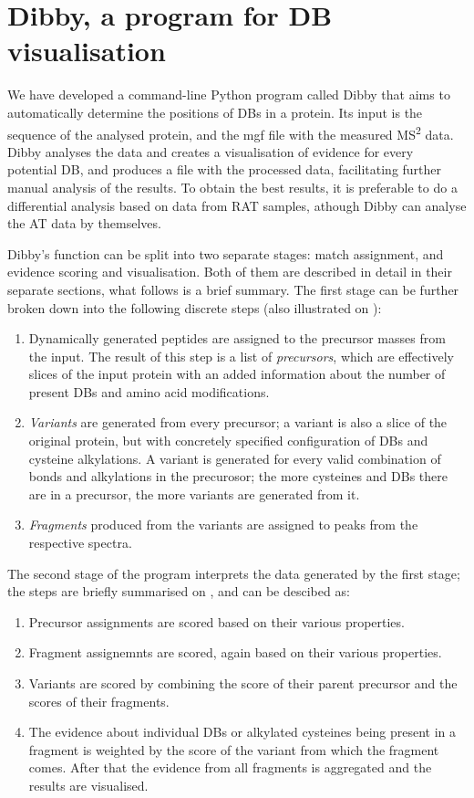 \section{Dibby, a program for DB visualisation}

We have developed a command-line Python program called Dibby that aims to automatically determine the positions of DBs in a protein. Its input is the sequence of the analysed protein, and the mgf file with the measured MS\textsuperscript{2} data. Dibby analyses the data and creates a visualisation of evidence for every potential DB, and produces a file with the processed data, facilitating further manual analysis of the results. To obtain the best results, it is preferable to do a differential analysis based on data from RAT samples, athough Dibby can analyse the AT data by themselves.

Dibby's function can be split into two separate stages: match assignment, and evidence scoring and visualisation. Both of them are described in detail in their separate sections, what follows is a brief summary. The first stage can be further broken down into the following discrete steps (also illustrated on ):

\begin{enumerate}
  \item Dynamically generated peptides are assigned to the precursor masses from the input. The result of this step is a list of \emph{precursors}, which are effectively slices of the input protein with an added information about the number of present DBs and amino acid modifications.
  \item \emph{Variants} are generated from every precursor; a variant is also a slice of the original protein, but with concretely specified configuration of DBs and cysteine alkylations. A variant is generated for every valid combination of bonds and alkylations in the precurosor; the more cysteines and DBs there are in a precursor, the more variants are generated from it.
  \item \emph{Fragments} produced from the variants are assigned to peaks from the respective spectra.
\end{enumerate}

The second stage of the program interprets the data generated by the first stage; the steps are briefly summarised on , and can be descibed as:

\begin{enumerate}
  \item Precursor assignments are scored based on their various properties.
  \item Fragment assignemnts are scored, again based on their various properties.
  \item Variants are scored by combining the score of their parent precursor and the scores of their fragments.
  \item The evidence about individual DBs or alkylated cysteines being present in a fragment is weighted by the score of the variant from which the fragment comes. After that the evidence from all fragments is aggregated and the results are visualised.
\end{enumerate}


